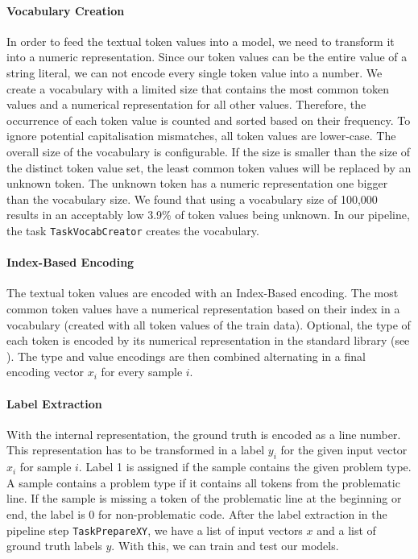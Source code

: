 \paragraph{Vocabulary Creation}
In order to feed the textual token values into a model, we need to transform it into a numeric representation. Since our token values can be the entire value of a string literal, we can not encode every single token value into a number. We create a vocabulary with a limited size that contains the most common token values and a numerical representation for all other values.
Therefore, the occurrence of each token value is counted and sorted based on their frequency. To ignore potential capitalisation mismatches, all token values are lower-case. The overall size of the vocabulary is configurable. If the size is smaller than the size of the distinct token value set, the least common token values will be replaced by an unknown token. The unknown token has a numeric representation one bigger than the vocabulary size. We found that using a vocabulary size of 100,000 results in an acceptably low 3.9\% of token values being unknown. In our pipeline, the task \texttt{TaskVocabCreator} creates the vocabulary.
\paragraph{Index-Based Encoding}
The textual token values are encoded with an Index-Based encoding. The most common token values have a numerical representation based on their index in a vocabulary (created with all token values of the train data). Optional, the type of each token is encoded by its numerical representation in the standard library (see ). The type and value encodings are then combined alternating in a final encoding vector $x_i$ for every sample $i$.
\paragraph{Label Extraction}
With the internal representation, the ground truth is encoded as a line number. This representation has to be transformed in a label $y_i$ for the given input vector $x_i$ for sample $i$. Label 1 is assigned if the sample contains the given problem type. A sample contains a problem type if it contains all tokens from the problematic line. If the sample is missing a token of the problematic line at the beginning or end, the label is 0 for non-problematic code.
After the label extraction in the pipeline step \texttt{TaskPrepareXY}, we have a list of input vectors $x$ and a list of ground truth labels $y$. With this, we can train and test our models.

